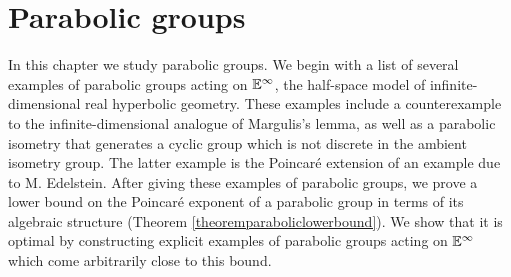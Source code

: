 %
%


\chapter{Parabolic groups}\label{sectionparabolic}

In this chapter we study parabolic groups. We begin with a list of several examples of parabolic groups acting on $\E^\infty$, the half-space model of infinite-dimensional real hyperbolic geometry. These examples include a counterexample to the infinite-dimensional analogue of Margulis's lemma, as well as a parabolic isometry that generates a cyclic group which is not discrete in the ambient isometry group. The latter example is the Poincar\'e extension of an example due to M. Edelstein. After giving these examples of parabolic groups, we prove a lower bound on the Poincar\'e exponent of a parabolic group in terms of its algebraic structure (Theorem \ref{theoremparaboliclowerbound}). We show that it is optimal by constructing explicit examples of parabolic groups acting on $\E^\infty$ which come arbitrarily close to this bound.

